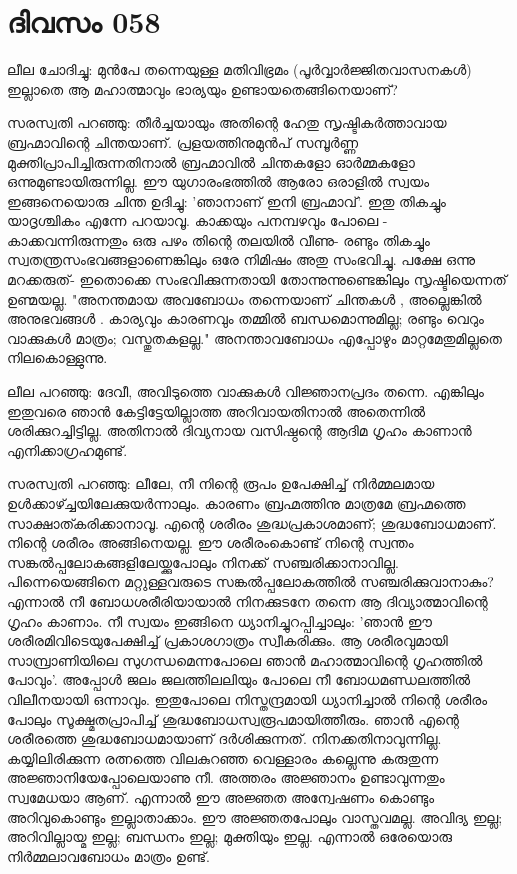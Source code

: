 \newpage
\section{ദിവസം 058}


ലീല ചോദിച്ചു: മുന്‍പേ തന്നെയുള്ള മതിവിഭ്രമം (പൂർവ്വാര്‍ജ്ജിതവാസനകൾ) ഇല്ലാതെ ആ മഹാത്മാവും ഭാര്യയും ഉണ്ടായതെങ്ങിനെയാണ്‌?

സരസ്വതി പറഞ്ഞു: തീര്‍ച്ചയായും അതിന്റെ ഹേതു സൃഷ്ടികര്‍ത്താവായ ബ്രഹ്മാവിന്റെ ചിന്തയാണ്‌. പ്രളയത്തിനുമുന്‍പ്‌ സമ്പൂര്‍ണ്ണ മുക്തിപ്രാപിച്ചിരുന്നതിനാല്‍ ബ്രഹ്മാവില്‍ ചിന്തകളോ ഓര്‍മ്മകളോ ഒന്നുമുണ്ടായിരുന്നില്ല. ഈ യുഗാരംഭത്തില്‍ ആരോ ഒരാളിൽ സ്വയം ഇങ്ങനെയൊരു ചിന്ത ഉദിച്ചു: 'ഞാനാണ്‌ ഇനി ബ്രഹ്മാവ്‌'. ഇതു തികച്ചും യാദൃശ്ചികം എന്നേ പറയാവൂ. കാക്കയും പനമ്പഴവും പോലെ - കാക്കവന്നിരുന്നതും ഒരു പഴം തിന്റെ തലയില്‍ വീണു- രണ്ടും തികച്ചും സ്വതന്ത്രസംഭവങ്ങളാണെങ്കിലും ഒരേ നിമിഷം അതു സംഭവിച്ചു. പക്ഷേ ഒന്നു മറക്കരുത്‌- ഇതൊക്കെ സംഭവിക്കുന്നതായി തോന്നുന്നുണ്ടെങ്കിലും സൃഷ്ടിയെന്നത്‌ ഉണ്മയല്ല. "അനന്തമായ അവബോധം തന്നെയാണ്‌ ചിന്തകള്‍ , അല്ലെങ്കില്‍ അനുഭവങ്ങള്‍ . കാര്യവും കാരണവും തമ്മില്‍ ബന്ധമൊന്നുമില്ല; രണ്ടും വെറും വാക്കുകള്‍ മാത്രം; വസ്തുതകളല്ല." അനന്താവബോധം എപ്പോഴും മാറ്റമേതുമില്ലതെ നിലകൊള്ളുന്നു.

ലീല പറഞ്ഞു: ദേവീ, അവിടുത്തെ വാക്കുകള്‍ വിജ്ഞാനപ്രദം തന്നെ. എങ്കിലും ഇതുവരെ ഞാന്‍ കേട്ടിട്ടേയില്ലാത്ത അറിവായതിനാല്‍ അതെന്നില്‍ ശരിക്കുറച്ചിട്ടില്ല. അതിനാല്‍ ദിവ്യനായ വസിഷ്ഠന്റെ ആദിമ ഗൃഹം കാണാന്‍ എനിക്കാഗ്രഹമുണ്ട്‌. 

സരസ്വതി പറഞ്ഞു: ലീലേ, നീ നിന്റെ രൂപം ഉപേക്ഷിച്ച്‌ നിര്‍മ്മലമായ ഉള്‍ക്കാഴ്ച്ചയിലേക്കുയര്‍ന്നാലും. കാരണം ബ്രഹ്മത്തിനു മാത്രമേ ബ്രഹ്മത്തെ സാക്ഷാത്കരിക്കാനാവൂ. എന്റെ ശരീരം ശുദ്ധപ്രകാശമാണ്‌; ശുദ്ധബോധമാണ്‌. നിന്റെ ശരീരം അങ്ങിനെയല്ല. ഈ ശരീരംകൊണ്ട്‌ നിന്റെ സ്വന്തം സങ്കല്‍പ്പലോകങ്ങളിലേയ്ക്കുപോലും നിനക്ക്‌ സഞ്ചരിക്കാനാവില്ല. പിന്നെയെങ്ങിനെ മറ്റുള്ളവരുടെ സങ്കല്‍പ്പലോകത്തില്‍ സഞ്ചരിക്കുവാനാകും? എന്നാല്‍ നീ ബോധശരീരിയായാല്‍ നിനക്കുടനേ തന്നെ ആ ദിവ്യാത്മാവിന്റെ ഗൃഹം കാണാം. നീ സ്വയം ഇങ്ങിനെ ധ്യാനിച്ചുറപ്പിച്ചാലും: 'ഞാന്‍ ഈ ശരീരമിവിടെയുപേക്ഷിച്ച്‌ പ്രകാശഗാത്രം സ്വീകരിക്കും. ആ ശരീരവുമായി സാമ്പ്രാണിയിലെ സുഗന്ധമെന്നപോലെ ഞാന്‍ മഹാത്മാവിന്റെ ഗൃഹത്തില്‍ പോവും'. അപ്പോള്‍ ജലം ജലത്തിലലിയും പോലെ നീ ബോധമണ്ഡലത്തില്‍ വിലീനയായി ഒന്നാവും. ഇതുപോലെ നിസ്തന്ദ്രമായി ധ്യാനിച്ചാല്‍ നിന്റെ ശരീരം പോലും സൂക്ഷ്മതപ്രാപിച്ച്‌ ശുദ്ധബോധസ്വരൂപമായിത്തീരും. ഞാന്‍ എന്റെ ശരീരത്തെ ശുദ്ധബോധമായാണ്‌ ദര്‍ശിക്കുന്നത്‌. നിനക്കതിനാവുന്നില്ല. കയ്യിലിരിക്കുന്ന രത്നത്തെ വിലകുറഞ്ഞ വെള്ളാരം കല്ലെന്നു കരുതുന്ന അജ്ഞാനിയേപ്പോലെയാണു നീ. അത്തരം അജ്ഞാനം ഉണ്ടാവുന്നതും സ്വമേധയാ ആണ്‌. എന്നാല്‍ ഈ അജ്ഞത അന്വേഷണം കൊണ്ടും അറിവുകൊണ്ടും ഇല്ലാതാക്കാം. ഈ അജ്ഞതപോലും വാസ്തവമല്ല. അവിദ്യ ഇല്ല; അറിവില്ലായ്മ ഇല്ല; ബന്ധനം ഇല്ല; മുക്തിയും ഇല്ല. എന്നാല്‍ ഒരേയൊരു നിര്‍മ്മലാവബോധം മാത്രം ഉണ്ട്‌.
